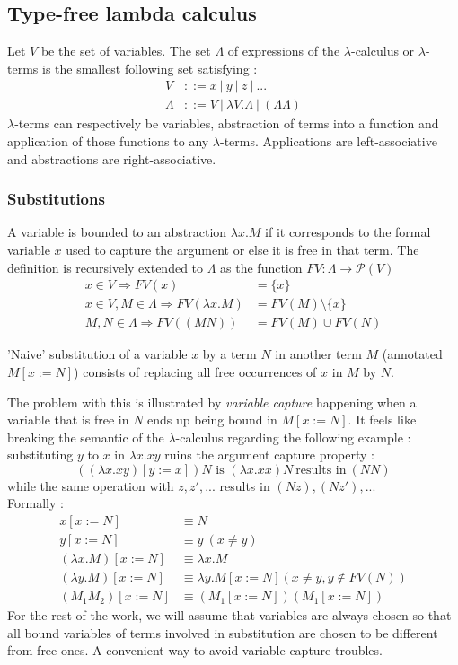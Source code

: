 \documentclass{article}
\begin{document}
\subsection{Type-free lambda calculus}
    Let $V$ be the set of variables. The set $\Lambda$ of expressions of the $\lambda$-calculus or $\lambda$-terms is the smallest following set  satisfying :
    \begin{align*}
        V &::= x \ | \ y \ | \ z \ | \ ... \\
        \Lambda &::= V \ | \ \lambda V.\Lambda \ | \ (\Lambda \Lambda)
    \end{align*}
    $\lambda$-terms can respectively be variables, abstraction of terms into a function and application of those functions to any $\lambda$-terms. Applications are left-associative and abstractions are right-associative.

    \subsubsection{Substitutions}\label{Free variables}
    A variable is bounded to an abstraction $\lambda x.M$ if it corresponds to the formal variable $x$ used to capture the argument or else it is free in that term. The definition is recursively extended to $\Lambda$ as the function $FV : \Lambda\rightarrow \mathscr{P}(V)$
    \begin{align*}
        x\in V \Rightarrow FV(x) &= \{x\}\\
        x\in V, M\in\Lambda \Rightarrow FV(\lambda x.M) &= FV(M) \setminus \{x\} \\
        M,N\in\Lambda \Rightarrow FV((M N)) &= FV(M)\cup FV(N)
    \end{align*}

    'Naive' substitution of a variable $x$ by a term $N$ in another term $M$ (annotated $M[x:=N]$) consists of replacing all free occurrences of $x$ in $M$ by $N$.\par The problem with this is illustrated by \textit{variable capture} happening when a variable that is free in $N$ ends up being bound in $M[x:=N]$. It feels like breaking the semantic of the $\lambda$-calculus regarding the following example : substituting $y$ to $x$  in $\lambda x.x y$ ruins the argument capture property :
    $$((\lambda x.x y)[y := x])N \text{ is } (\lambda x.x x)N \ \text{results in} \ (N N)$$ while the same operation with $z, z', ...$ results in $(N z), (N z'), ...$\\
    Formally :
    \label{simple substitution}\begin{align*}
            x[x:=N] &\equiv N\\
            y[x:=N] &\equiv y \ ( x\neq y)\\
            (\lambda x.M)[x:=N] &\equiv \lambda x.M \\
            (\lambda y.M)[x:=N] &\equiv \lambda y.M[x:=N]  (x\neq y,y\not\in FV(N)) \\
            (M_1 M_2)[x:=N] &\equiv (M_1[x:=N])(M_1[x:=N])
        \end{align*}
        For the rest of the work, we will assume that variables are always chosen so that all bound variables of terms involved in substitution are chosen to be different from free ones. A convenient way to avoid variable capture troubles.
\end{document}
